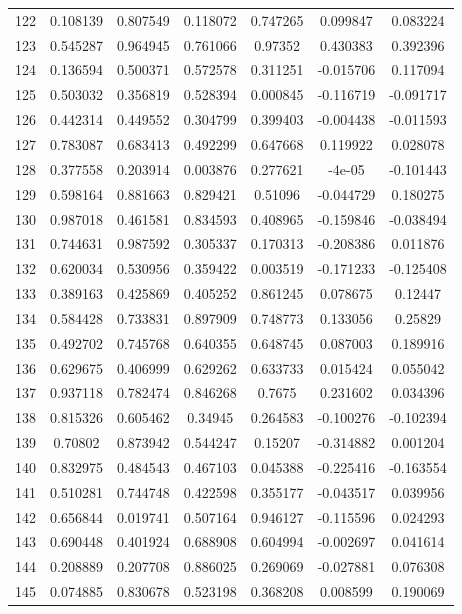 \begin{table}
\begin{tabular}{c|c|c|c|c|c|c}
122 & 0.108139 & 0.807549 & 0.118072 & 0.747265 & 0.099847 & 0.083224\\
123 & 0.545287 & 0.964945 & 0.761066 & 0.97352 & 0.430383 & 0.392396\\
124 & 0.136594 & 0.500371 & 0.572578 & 0.311251 & -0.015706 & 0.117094\\
125 & 0.503032 & 0.356819 & 0.528394 & 0.000845 & -0.116719 & -0.091717\\
126 & 0.442314 & 0.449552 & 0.304799 & 0.399403 & -0.004438 & -0.011593\\
127 & 0.783087 & 0.683413 & 0.492299 & 0.647668 & 0.119922 & 0.028078\\
128 & 0.377558 & 0.203914 & 0.003876 & 0.277621 & -4e-05 & -0.101443\\
129 & 0.598164 & 0.881663 & 0.829421 & 0.51096 & -0.044729 & 0.180275\\
130 & 0.987018 & 0.461581 & 0.834593 & 0.408965 & -0.159846 & -0.038494\\
131 & 0.744631 & 0.987592 & 0.305337 & 0.170313 & -0.208386 & 0.011876\\
132 & 0.620034 & 0.530956 & 0.359422 & 0.003519 & -0.171233 & -0.125408\\
133 & 0.389163 & 0.425869 & 0.405252 & 0.861245 & 0.078675 & 0.12447\\
134 & 0.584428 & 0.733831 & 0.897909 & 0.748773 & 0.133056 & 0.25829\\
135 & 0.492702 & 0.745768 & 0.640355 & 0.648745 & 0.087003 & 0.189916\\
136 & 0.629675 & 0.406999 & 0.629262 & 0.633733 & 0.015424 & 0.055042\\
137 & 0.937118 & 0.782474 & 0.846268 & 0.7675 & 0.231602 & 0.034396\\
138 & 0.815326 & 0.605462 & 0.34945 & 0.264583 & -0.100276 & -0.102394\\
139 & 0.70802 & 0.873942 & 0.544247 & 0.15207 & -0.314882 & 0.001204\\
140 & 0.832975 & 0.484543 & 0.467103 & 0.045388 & -0.225416 & -0.163554\\
141 & 0.510281 & 0.744748 & 0.422598 & 0.355177 & -0.043517 & 0.039956\\
142 & 0.656844 & 0.019741 & 0.507164 & 0.946127 & -0.115596 & 0.024293\\
143 & 0.690448 & 0.401924 & 0.688908 & 0.604994 & -0.002697 & 0.041614\\
144 & 0.208889 & 0.207708 & 0.886025 & 0.269069 & -0.027881 & 0.076308\\
145 & 0.074885 & 0.830678 & 0.523198 & 0.368208 & 0.008599 & 0.190069\\

\end{tabular}
\end{table}
